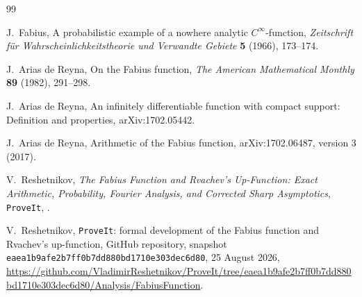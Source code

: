 \documentclass[11pt,oneside]{article}
\theoremstyle{definition}
\theoremstyle{remark}
\begin{document}
\nocite{integration:fabius1966,integration:arias1982,integration:arias05442,integration:arias2018,integration:mainarticle,integration:repo}
\renewcommand{\refname}{Topic references}
\begin{thebibliography}{99}

J.~Fabius,
\newblock A probabilistic example of a nowhere analytic $C^\infty$-function,
\newblock \emph{Zeitschrift f\"ur Wahrscheinlichkeitstheorie und Verwandte Gebiete}
\textbf{5} (1966), 173--174.

J.~Arias de Reyna,
\newblock On the Fabius function,
\newblock \emph{The American Mathematical Monthly} \textbf{89} (1982), 291--298.

J.~Arias de Reyna,
\newblock An infinitely differentiable function with compact support: Definition and properties,
\newblock arXiv:1702.05442.

J.~Arias de Reyna,
\newblock Arithmetic of the Fabius function,
\newblock arXiv:1702.06487, version 3 (2017).

V.~Reshetnikov,
\newblock \emph{The Fabius Function and Rvachev's Up-Function: Exact Arithmetic,
Probability, Fourier Analysis, and Corrected Sharp Asymptotics},
\newblock \texttt{ProveIt},
.

V.~Reshetnikov,
\newblock \texttt{ProveIt}: formal development of the Fabius function and Rvachev's
up-function,
\newblock GitHub repository, snapshot
\texttt{eaea1b9afe2b7ff0b7dd880bd1710e303dec6d80}, 25 August 2026,
\newblock \url{https://github.com/VladimirReshetnikov/ProveIt/tree/eaea1b9afe2b7ff0b7dd880bd1710e303dec6d80/Analysis/FabiusFunction}.

\end{thebibliography}


\renewcommand{\arraystretch}{1}


\clearpage
\end{document}
